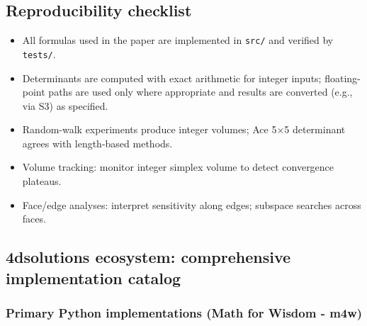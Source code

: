 \documentclass[
  10pt,
]{article}
\providecommand{\tightlist}{%
  \setlength{\itemsep}{0pt}\setlength{\parskip}{0pt}}
\begin{document}
\hypertarget{reproducibility-checklist}{%
\subsection{Reproducibility checklist}\label{reproducibility-checklist}}

\begin{itemize}
\tightlist
\item
  All formulas used in the paper are implemented in \texttt{src/} and
  verified by \texttt{tests/}.
\item
  Determinants are computed with exact arithmetic for integer inputs;
  floating-point paths are used only where appropriate and results are
  converted (e.g., via S3) as specified.
\item
  Random-walk experiments produce integer volumes; Ace 5×5 determinant
  agrees with length-based methods.
\item
  Volume tracking: monitor integer simplex volume to detect convergence
  plateaus.
\item
  Face/edge analyses: interpret sensitivity along edges; subspace
  searches across faces.
\end{itemize}

\hypertarget{dsolutions-ecosystem-comprehensive-implementation-catalog}{%
\subsection{4dsolutions ecosystem: comprehensive implementation
catalog}\label{dsolutions-ecosystem-comprehensive-implementation-catalog}}

\hypertarget{primary-python-implementations-math-for-wisdom---m4w}{%
\subsubsection{Primary Python implementations (Math for Wisdom -
m4w)}\label{primary-python-implementations-math-for-wisdom---m4w}}
\end{document}
